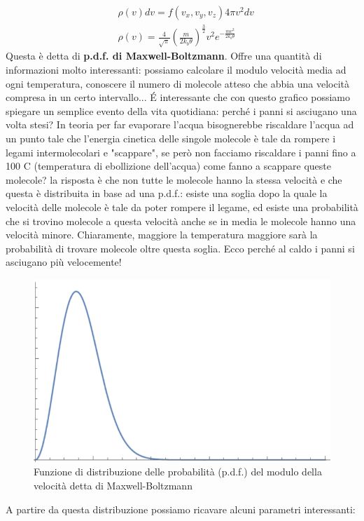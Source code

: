 \documentclass[10pt,a4paper]{article}
\begin{document}
\FloatBarrier
\begin{align}\label{eq:pdfMaxwellvelocità}
	&\rho(v) dv = f(v_x, v_y, v_z) 4\pi v^2 dv \nonumber \\
	&\rho(v)=\frac{4}{\sqrt{\pi}}\left(\frac{m}{2k_b\theta}\right)^{\frac{3}{2}} v^2 e^{-\frac{mv^2}{2 k_b \theta}}
\end{align} 
Questa è detta di \textbf{p.d.f. di Maxwell-Boltzmann}. Offre una quantità di informazioni molto interessanti: possiamo calcolare il modulo velocità media ad ogni temperatura, conoscere il numero di molecole atteso che abbia una velocità compresa in un certo intervallo... \'{E} interessante che con questo grafico possiamo spiegare un semplice evento della vita quotidiana: perché i panni si asciugano una volta stesi? In teoria per far evaporare l'acqua bisognerebbe riscaldare l'acqua ad un punto tale che l'energia cinetica delle singole molecole è tale da rompere i legami intermolecolari e "scappare", se però non facciamo riscaldare i panni fino a 100 \textdegree C (temperatura di ebollizione dell'acqua) come fanno a scappare queste molecole? la risposta è che non tutte le molecole hanno la stessa velocità e che questa è distribuita in base ad una p.d.f.: esiste una soglia dopo la quale la velocità delle molecole è tale da poter rompere il legame, ed esiste una probabilità che si trovino molecole a questa velocità anche se in media le molecole hanno una velocità minore. Chiaramente, maggiore la temperatura maggiore sarà la probabilità di trovare molecole oltre questa soglia. Ecco perché al caldo i panni si asciugano più velocemente!
\begin{figure}[h!]
	\centering
	\includegraphics[width=0.6\linewidth]{../images/speedpdf}
	\caption{Funzione di distribuzione delle probabilità (p.d.f.) del modulo della velocità detta di Maxwell-Boltzmann}
	\label{fig:speedpdf}
\end{figure}
 \FloatBarrier
A partire da questa distribuzione possiamo ricavare alcuni parametri interessanti:
\end{document}
